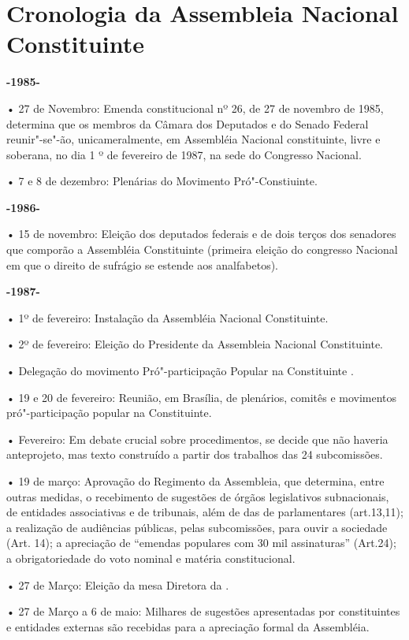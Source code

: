 \chapter{Cronologia da Assembleia Nacional Constituinte}

\textbf{-1985-}

• 27 de Novembro: Emenda constitucional nº 26, de 27 de novembro de
1985, determina que os membros da Câmara dos Deputados e do Senado
Federal reunir"-se"-ão, unicameralmente, em Assembléia Nacional
constituinte, livre e soberana, no dia 1 º de fevereiro de 1987, na sede
do Congresso Nacional.

• 7 e 8 de dezembro: Plenárias do Movimento Pró"-Constiuinte.

\textbf{-1986-}

• 15 de novembro: Eleição dos deputados federais e de dois terços dos
senadores que comporão a Assembléia Constituinte (primeira eleição do
congresso Nacional em que o direito de sufrágio se estende aos
analfabetos).

\textbf{-1987-}

• 1º de fevereiro: Instalação da Assembléia Nacional Constituinte.

• 2º de fevereiro: Eleição do Presidente da Assembleia Nacional
Constituinte.

• Delegação do movimento Pró"-participação Popular na Constituinte .

• 19 e 20 de fevereiro: Reunião, em Brasília, de plenários, comitês e
movimentos pró"-participação popular na Constituinte.

• Fevereiro: Em debate crucial sobre procedimentos, se decide que não
haveria anteprojeto, mas texto construído a partir dos trabalhos das 24
subcomissões.

• 19 de março: Aprovação do Regimento da Assembleia, que determina,
entre outras medidas, o recebimento de sugestões de órgãos legislativos
subnacionais, de entidades associativas e de tribunais, além de das de
parlamentares (art.13,11); a realização de audiências públicas, pelas
subcomissões, para ouvir a sociedade (Art. 14); a apreciação de
``emendas populares com 30 mil assinaturas'' (Art.24); a obrigatoriedade
do voto nominal e matéria constitucional.

• 27 de Março: Eleição da mesa Diretora da .

• 27 de Março a 6 de maio: Milhares de sugestões apresentadas por
constituintes e entidades externas são recebidas para a apreciação
formal da Assembléia.


